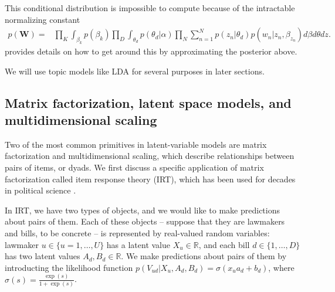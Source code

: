 This conditional distribution is impossible to compute because of the
intractable normalizing constant
\begin{align} 
  p(\bm W) = & \prod_K \int_{\beta_k} p(\beta_k)
  \prod_D \int_{\theta_d} p(\theta_d | \alpha) \prod_N \sum_{n=1}^N p(z_n | \theta_d) p(w_n | z_n, \beta_{z_n}) d\beta d\theta dz.
\end{align}
 provides details on how to get around
this by approximating the posterior above.

We will use topic models like LDA for several purposes in later
sections.



\subsection{Matrix factorization, latent space models, and
  multidimensional scaling}

Two of the most common primitives in latent-variable models are matrix
factorization \cite{salakhutdinov:2008a} and multidimensional scaling,
which describe relationships between pairs of items, or dyads. We
first discuss a specific application of matrix factorization called
item response theory (IRT), which has been used for decades in
political science
\cite{clinton:2004,martin:2002,poole:1991,enelow:1984,albert:1992}.

In IRT, we have two types of objects, and we would like to make
predictions about pairs of them.  Each of these objects -- suppose
that they are lawmakers and bills, to be concrete -- is represented by
real-valued random variables: lawmaker $u \in \{ u=1, \ldots, U \}$
has a latent value $X_u \in \mathbb{R}$, and each bill $d \in \{ 1,
\ldots, D \}$ has two latent values $A_d,B_d \in \mathbb{R}$.  We make
predictions about pairs of them by introducting the likelihood
function $p(V_{ud} | X_u, A_d, B_d) = \sigma( x_u a_d + b_d )$, where
$\sigma(s) = \frac{\exp(s)}{ 1 + \exp(s) }$.

